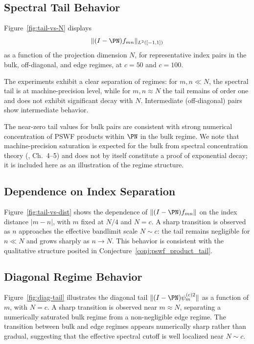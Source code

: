 \subsection{Spectral Tail Behavior}
\label{sec:numerics-tail}

Figure~\ref{fig:tail-vs-N} displays
\[
  \|(I-\PN)f_{mn}\|_{L^2([-1,1])}
\]
as a function of the projection dimension $N$,
for representative index pairs in the bulk,
off-diagonal, and edge regimes,
at $c = 50$ and $c = 100$.

The experiments exhibit a clear separation of regimes:
for $m, n \ll N$, the spectral tail is at machine-precision level,
while for $m, n \approx N$ the tail remains of order one
and does not exhibit significant decay with $N$.
Intermediate (off-diagonal) pairs show intermediate behavior.

\begin{remark}
The near-zero tail values for bulk pairs
are consistent with strong numerical concentration
of PSWF products within $\PN$
in the bulk regime.
We note that machine-precision saturation
is expected for the bulk from spectral concentration
theory (\cite{OsipovRokhlinXiao}, Ch.~4--5)
and does not by itself constitute a proof of exponential decay;
it is included here as an illustration of the regime structure.
\end{remark}

\subsection{Dependence on Index Separation}
\label{sec:numerics-dist}

Figure~\ref{fig:tail-vs-dist}
shows the dependence of
$\|(I-\PN)f_{mn}\|$ on the index distance $|m-n|$,
with $m$ fixed at $N/4$ and $N = c$.
A sharp transition is observed
as $n$ approaches the effective bandlimit scale $N \sim c$:
the tail remains negligible for $n \ll N$
and grows sharply as $n \to N$.
This behavior is consistent with
the qualitative structure posited in
Conjecture~\ref{conj:pswf_product_tail}.

\subsection{Diagonal Regime Behavior}
\label{sec:numerics-diag}

Figure~\ref{fig:diag-tail}
illustrates the diagonal tail
$\|(I-\PN)\psi_m^{(c)2}\|$
as a function of $m$, with $N = c$.
A sharp transition is observed near $m \approx N$,
separating a numerically saturated bulk regime
from a non-negligible edge regime.
The transition between bulk and edge regimes
appears numerically sharp rather than gradual,
suggesting that the effective spectral cutoff
is well localized near $N \sim c$.

